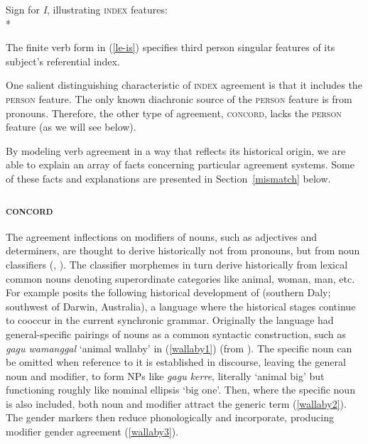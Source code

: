 \documentclass[output=paper,biblatex,babelshorthands,newtxmath,draftmode,colorlinks,citecolor=brown]{langscibook}
\begin{document}
\begin{exe} 
\ex	\label{entryfori2}
Sign for  \textit{I}, illustrating  \textsc{index} features:\\*
\end{exe}

\noindent
The finite verb form in (\ref{le-is}) specifies third person singular features of its subject's referential index.  

One salient distinguishing characteristic of \textsc{index} agreement is that it includes the \textsc{person} feature.  The only known diachronic source of the \textsc{person} feature is from pronouns.  Therefore, the other type of agreement, \textsc{concord}, lacks the \textsc{person} feature (as we will see below).  

By modeling verb agreement in a way that reflects its historical origin, we are able to explain an array of facts concerning particular agreement systems.   Some of these facts and explanations are presented in Section~\ref{mismatch} below.  
 



\subsubsection{\textsc{concord}}
\label{concord-sec}

The agreement inflections on modifiers of nouns, such as adjectives and determiners, are thought to
derive historically not from pronouns, but from noun classifiers
(\citealt{greenberg:1978,reid:1997,Seifart:2009,Grinevald+Seifart:2004},
\citealt[268--269]{corbett:2006}).  The classifier morphemes in turn derive historically from
lexical common nouns denoting superordinate categories like animal, woman, man, etc.  For example
\citet{reid:1997} posits the following historical development of  (southern
Daly; southwest of Darwin, Australia), a language where the historical stages continue to cooccur in
the current synchronic grammar.  Originally the language had general-specific pairings of nouns as a
common syntactic construction, such as \textit{gagu wamanggal} `animal wallaby’ in (\ref{wallaby1})
(from \citealt[216]{reid:1997}).  The specific noun can be omitted when reference to it is
established in discourse, leaving the general noun and modifier, to form NPs like \textit{gagu
  kerre}, literally `animal big’ but functioning roughly like nominal ellipsis `big one’.  Then,
where the specific noun is also included, both noun and modifier attract the generic term
(\ref{wallaby2}).  The gender markers then reduce phonologically and incorporate, producing modifier
gender agreement (\ref{wallaby3}).
\end{document}
